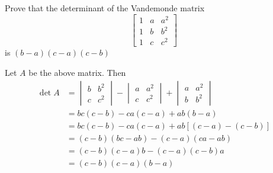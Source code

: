 \documentclass[a4paper, 10pt]{article}
\begin{document}
\begin{problem} 
Prove that the determinant of the Vandemonde matrix \[
    \left[\begin{array}{ccc}
            1 & a & a^2 \\
            1 & b & b^2 \\
            1 & c & c^2
        \end{array}\right]
\]
is \((b-a)(c-a)(c-b)\)
\end{problem}
\begin{solution}
    Let \(A\) be the above matrix. Then
    \begin{align*}
        \det A & =\begin{vmatrix}
                         b & b^2 \\
                         c & c^2
                     \end{vmatrix}
        - \begin{vmatrix}
              a & a^2 \\
              c & c^2
          \end{vmatrix} + \begin{vmatrix}
                              a & a^2 \\
                              b & b^2
                          \end{vmatrix} \\
        &= bc(c-b) - ca(c-a) + ab(b-a) \\
        &= bc(c-b) - ca(c-a) + ab[(c-a) - (c-b)] \\
        &= (c-b)(bc-ab) - (c-a)(ca-ab)\\
        &= (c-b)(c-a)b - (c-a)(c-b)a \\
        &= (c-b)(c-a)(b-a)
    \end{align*}
\end{solution}
\end{document}
